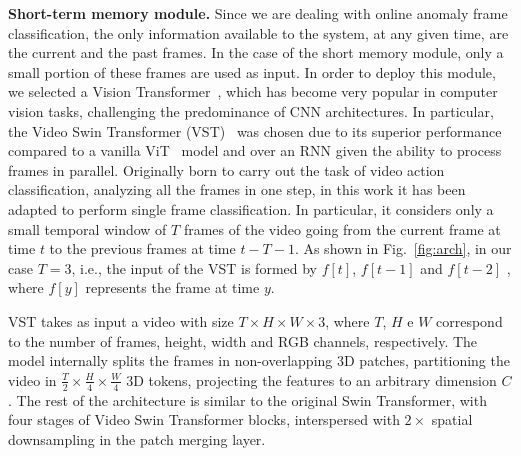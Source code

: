 \noindent\textbf{Short-term memory module.}
Since we are dealing with online anomaly frame classification, the only information available to the system, at any given time, are the current and the past frames.
In the case of the short memory module, only a small portion of these frames are used as input.
In order to deploy this module, we selected a Vision Transformer~\cite{DBLP:conf/iclr/DosovitskiyB0WZ21}, which has become very popular in computer vision tasks, challenging the predominance of CNN architectures. 
In particular, the Video Swin Transformer (VST)~\cite{liu_video_2022} was chosen due to its superior performance compared to a vanilla ViT~\cite{DBLP:conf/iclr/DosovitskiyB0WZ21} model
and over an RNN  given the ability to process frames in parallel.
Originally born to carry out the task of video action classification, analyzing all the frames in one step, in this work it has been adapted to perform single frame classification.
In particular, it considers only a small temporal window of $T$ frames of the video going from the current frame at time $t$ to the previous frames at time $t-T-1$.
As shown in Fig.~\ref{fig:arch}, in our case $T=3$, i.e., the input of the VST is formed by $f[t]$, $f[t-1]$ and $f[t-2]$ , where $f[y]$ represents the frame at time $y$.

VST takes as input a video with size $T \times H \times W \times 3$, where $T$, $H$ e $W$ correspond to the number of frames, height, width and RGB channels, respectively.
The model internally splits the frames in non-overlapping 3D patches, partitioning the video in $\frac{T}{2} \times \frac{H}{4} \times \frac{W}{4}$ 3D tokens, projecting the features to an arbitrary dimension $C$.
The rest of the architecture is similar to the original Swin Transformer, with four stages of Video Swin Transformer blocks, 
interspersed with $2\times$ spatial downsampling in the patch merging layer.

